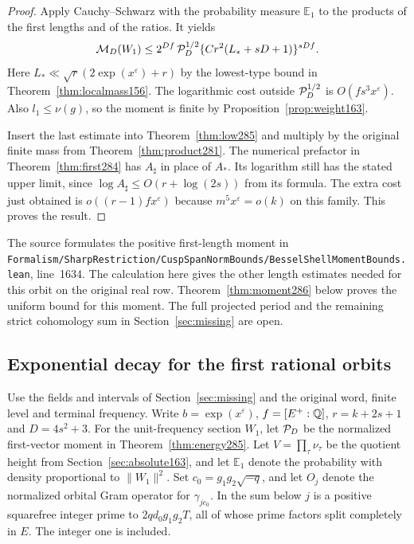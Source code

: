 \documentclass[a4paper,11pt]{article}
\theoremstyle{definition}
\theoremstyle{remark}
\newcommand{\srcloc}[2]{{\small\nolinkurl{#1.lean}}, line~#2}
\numberwithin{equation}{section}
\begin{document}
\begin{proof}
Apply Cauchy--Schwarz with the probability measure
\(\mathbb E_1\) to the products of the first lengths and
of the ratios. It yields
\[
 {\cal M}_D(W_1)\le
     2^{Df}\,{\cal P}_D^{1/2}
                   \{C r^2(L_*+sD+1)\}^{sDf}.
\]
Here \(L_*\ll\sqrt r(2\exp(x^\varepsilon)+r)\) by the
lowest-type bound in Theorem~\ref{thm:localmass156}.
The logarithmic cost outside \({\cal P}_D^{1/2}\) is
\(O(fs^3x^\varepsilon)\). Also \(l_1\le\nu(g)\), so the
moment is finite by Proposition~\ref{prop:weight163}.

Insert the last estimate into Theorem~\ref{thm:low285}
and multiply by the original finite mass from
Theorem~\ref{thm:product281}. The numerical prefactor in
Theorem~\ref{thm:first284} has \(A_\sharp\) in place of
\(A_*\). Its logarithm still has the stated upper limit,
since \(\log A_\sharp\le O(r+\log(2s))\) from its formula.
The extra cost just obtained is \(o((r-1)f x^\varepsilon)\)
because \(m^5x^\varepsilon=o(k)\) on this family.
This proves the result.
\end{proof}

The source formulates the positive first-length moment in
\srcloc{Formalism/SharpRestriction/CuspSpanNormBounds/BesselShellMomentBounds}{1634}.
The calculation here gives the other length estimates needed
for this orbit on the original real row. Theorem~\ref{thm:moment286} below proves the uniform bound
for this moment. The full projected period and the remaining
strict cohomology sum in Section~\ref{sec:missing} are open.

\subsection{Exponential decay for the first rational orbits}\label{nav:I-66}
Use the fields and intervals of Section~\ref{sec:missing} and the original
word, finite level and terminal frequency. Write
\(b=\exp(x^\varepsilon)\), \(f=[E^+:\mathbb Q]\),
\(r=k+2s+1\) and \(D=4s^2+3\). For the unit-frequency section
\(W_1\), let \({\cal P}_D\) be the normalized first-vector
moment in Theorem~\ref{thm:energy285}. Let \(V=\prod_\tau\nu_\tau\)
be the quotient height from Section~\ref{sec:absolute163}, and
let \(\mathbb E_1\) denote the probability with density proportional
to \(\|W_1\|^2\). Set
\(c_0=g_1g_2\sqrt{-q}\), and let \(O_j\) denote the
normalized orbital Gram operator for \(\gamma_{j c_0}\).
In the sum below \(j\) is a positive squarefree integer
prime to \(2q d_0 g_1g_2T\), all of whose prime factors split
completely in \(E\). The integer one is included.
\end{document}
